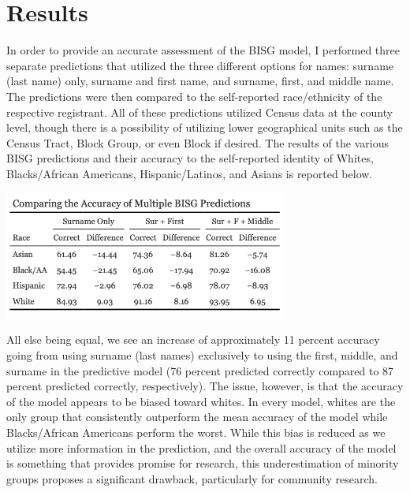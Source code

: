 \documentclass[
]{article}
\begin{document}
\hypertarget{results}{%
\section{Results}\label{results}}

In order to provide an accurate assessment of the BISG model, I
performed three separate predictions that utilized the three different
options for names: surname (last name) only, surname and first name, and
surname, first, and middle name. The predictions were then compared to
the self-reported race/ethnicity of the respective registrant. All of
these predictions utilized Census data at the county level, though there
is a possibility of utilizing lower geographical units such as the
Census Tract, Block Group, or even Block if desired. The results of the
various BISG predictions and their accuracy to the self-reported
identity of Whites, Blacks/African Americans, Hispanic/Latinos, and
Asians is reported below.

\includegraphics[width=0.7\textwidth,height=\textheight]{tab1.png}

All else being equal, we see an increase of approximately 11 percent
accuracy going from using surname (last names) exclusively to using the
first, middle, and surname in the predictive model (76 percent predicted
correctly compared to 87 percent predicted correctly, respectively). The
issue, however, is that the accuracy of the model appears to be biased
toward whites. In every model, whites are the only group that
consistently outperform the mean accuracy of the model while
Blacks/African Americans perform the worst. While this bias is reduced
as we utilize more information in the prediction, and the overall
accuracy of the model is something that provides promise for research,
this underestimation of minority groups proposes a significant drawback,
particularly for community research.
\end{document}
